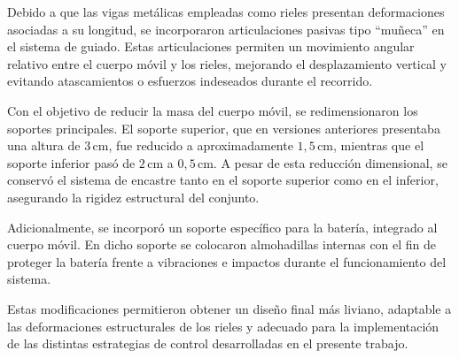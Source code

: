 Debido a que las vigas metálicas empleadas como rieles presentan deformaciones asociadas a su longitud, se incorporaron articulaciones pasivas tipo ``muñeca'' en el sistema de guiado. Estas articulaciones permiten un movimiento angular relativo entre el cuerpo móvil y los rieles, mejorando el desplazamiento vertical y evitando atascamientos o esfuerzos indeseados durante el recorrido.

Con el objetivo de reducir la masa del cuerpo móvil, se redimensionaron los soportes principales. El soporte superior, que en versiones anteriores presentaba una altura de \(3\,\text{cm}\), fue reducido a aproximadamente \(1{,}5\,\text{cm}\), mientras que el soporte inferior pasó de \(2\,\text{cm}\) a \(0{,}5\,\text{cm}\). A pesar de esta reducción dimensional, se conservó el sistema de encastre tanto en el soporte superior como en el inferior, asegurando la rigidez estructural del conjunto.

Adicionalmente, se incorporó un soporte específico para la batería, integrado al cuerpo móvil. En dicho soporte se colocaron almohadillas internas con el fin de proteger la batería frente a vibraciones e impactos durante el funcionamiento del sistema.

Estas modificaciones permitieron obtener un diseño final más liviano, adaptable a las deformaciones estructurales de los rieles y adecuado para la implementación de las distintas estrategias de control desarrolladas en el presente trabajo.

